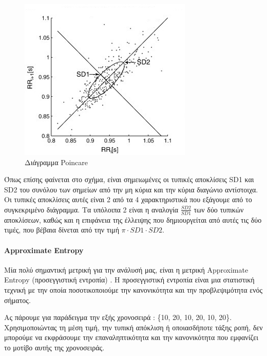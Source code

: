 \begin{figure}[h]
    \centering
    \includegraphics[scale=0.85]{latex_code/Figures_new/poincare2.jpg}
    \caption{Διάγραμμα Poincare}
    \label{fig:poincare_plot}
\end{figure}


Όπως επίσης φαίνεται στο σχήμα, είναι σημειωμένες οι τυπικές αποκλίσεις SD1 και SD2 του συνόλου των σημείων από την μη κύρια και την κύρια διαγώνιο αντίστοιχα. Οι τυπικές αποκλίσεις αυτές είναι 2 από τα 4 χαρακτηριστικά που εξάγουμε από το συγκεκριμένο διάγραμμα. Τα υπόλοιπα 2 είναι η αναλογία $\frac{SD2}{SD1}$ των δύο τυπικών αποκλίσεων, καθώς και η επιφάνεια της έλλειψης που δημιουργείται από αυτές τις δύο τιμές, που βέβαια δίνεται από την τιμή $\pi \cdot SD1 \cdot SD2$.

\paragraph{Approximate Entropy}

Μία πολύ σημαντική μετρική για την ανάλυσή μας, είναι η μετρική Approximate Entropy (προσεγγιστική εντροπία) \cite{wikiAppEn}. Η προσεγγιστική εντροπία είναι μια στατιστική τεχνική με την οποία ποσοτικοποιούμε την κανονικότητα και την προβλεψιμότητα ενός σήματος. 

Ας πάρουμε για παράδειγμα την εξής χρονοσειρά : \{10, 20, 10, 20, 10, 20\}. Χρησιμοποιώντας τη μέση τιμή, την τυπική απόκλιση ή οποιασδήποτε τάξης ροπή, δεν μπορούμε να εκφράσουμε την επαναληπτικότητα και την κανονικότητα που εμφανίζει το μοτίβο αυτής της χρονοσειράς. 

